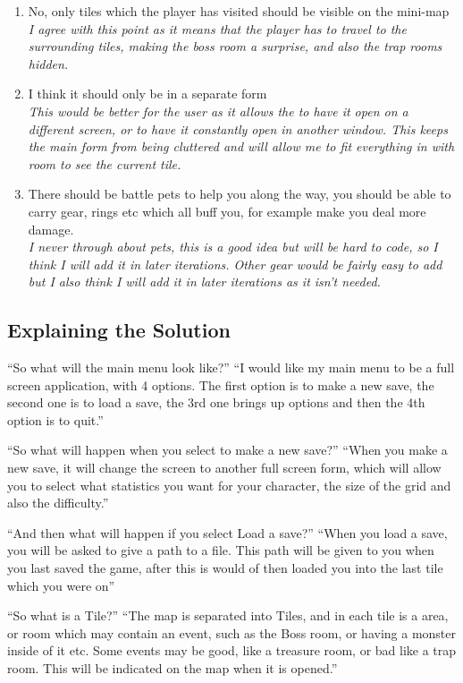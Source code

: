 \documentclass[12pt]{article}
\begin{document}
\begin{enumerate}
	\item{No, only tiles which the player has visited should be visible on the mini-map \\}
	\em{I agree with this point as it means that the player has to travel to the surrounding tiles, making the boss room a surprise, and also the trap rooms hidden.}

	\item{I think it should only be in a separate form \\}
	\em{This would be better for the user as it allows the to have it open on a different screen, or to have it constantly open in another window. This keeps the main form from being cluttered and will allow me to fit everything in with room to see the current tile.}

	\item{There should be battle pets to help you along the way, you should be able to carry gear, rings etc which all buff you, for example make you deal more damage. \\}
	\em{I never through about pets, this is a good idea but will be hard to code, so I think I will add it in later iterations. Other gear would be fairly easy to add but I also think I will add it in later iterations as it isn't needed.}
\end{enumerate}

		\subsection{Explaining the Solution}

“So what will the main menu look like?”
“I would like my main menu to be a full screen application, with 4 options. The first option is to make a new save, the second one is to load a save, the 3rd one brings up options and then the 4th option is to quit.”

“So what will happen when you select to make a new save?”
“When you make a new save, it will change the screen to another full screen form, which will allow you to select what statistics you want for your character, the size of the grid and also the difficulty.”

“And then what will happen if you select Load a save?”
“When you load a save, you will be asked to give a path to a file. This path will be given to you when you last saved the game, after this is would of then loaded you into the last tile which you were on”

“So what is a Tile?”
“The map is separated into Tiles, and in each tile is a area, or room which may contain an event, such as the Boss room, or having a monster inside of it etc. Some events may be good, like a treasure room, or bad like a trap room. This will be indicated on the map when it is opened.”
\end{document}

